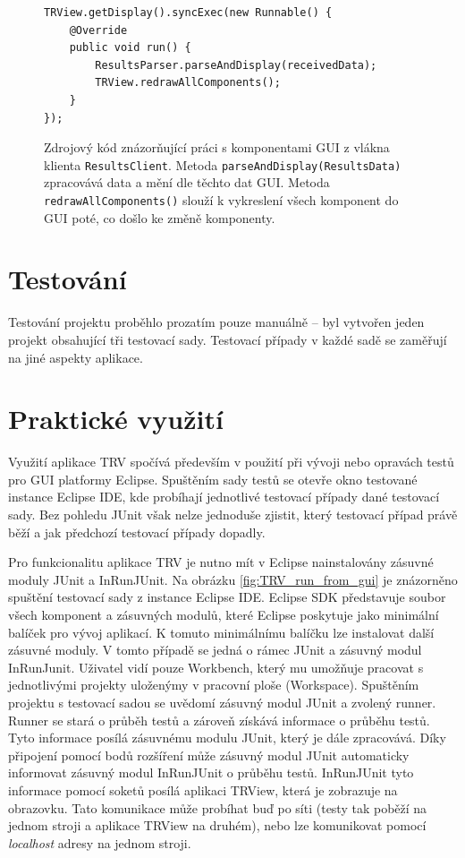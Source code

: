       	\lstset{language=java}
	\begin{figure}
	  \begin{lstlisting}[frame=single]
TRView.getDisplay().syncExec(new Runnable() {
	@Override
	public void run() {
		ResultsParser.parseAndDisplay(receivedData);
		TRView.redrawAllComponents();
	}
});
	  \end{lstlisting}
	  \caption{Zdrojový kód znázorňující práci s komponentami GUI z vlákna klienta \texttt{ResultsClient}. Metoda \texttt{parseAndDisplay(ResultsData)} zpracovává data a mění dle těchto dat GUI. Metoda \texttt{redrawAllComponents()} slouží k vykreslení všech komponent do GUI poté, co došlo ke změně komponenty.}
	  \label{code:syncExec}
	\end{figure}
      
      
      
  \section{Testování}
  Testování projektu proběhlo prozatím pouze manuálně -- byl vytvořen jeden projekt obsahující tři testovací sady. Testovací případy v každé sadě se zaměřují na jiné aspekty aplikace. 

  \section{Praktické využití}
  Využití aplikace TRV spočívá především v použití při vývoji nebo opravách testů pro GUI platformy Eclipse. Spuštěním sady testů se otevře okno testované instance Eclipse IDE, kde probíhají jednotlivé testovací případy dané testovací sady. Bez pohledu JUnit však nelze jednoduše zjistit, který testovací případ právě běží a jak předchozí testovací případy dopadly.
  
  Pro funkcionalitu aplikace TRV je nutno mít v Eclipse nainstalovány zásuvné moduly JUnit a InRunJUnit. Na obrázku \ref{fig:TRV_run_from_gui} je znázorněno spuštění testovací sady z instance Eclipse IDE. Eclipse SDK představuje soubor všech komponent a zásuvných modulů, které Eclipse poskytuje jako minimální balíček pro vývoj aplikací. K tomuto minimálnímu balíčku lze instalovat další zásuvné moduly. V tomto případě se jedná o rámec JUnit a zásuvný modul InRunJunit. Uživatel vidí pouze Workbench, který mu umožňuje pracovat s jednotlivými projekty uloženýmy v pracovní ploše (Workspace). Spuštěním projektu s testovací sadou se uvědomí zásuvný modul JUnit a zvolený runner. Runner se stará o průběh testů a zároveň získává informace o průběhu testů. Tyto informace posílá zásuvnému modulu JUnit, který je dále zpracovává. Díky připojení pomocí bodů rozšíření může zásuvný modul JUnit automaticky informovat zásuvný modul InRunJUnit o průběhu testů. InRunJUnit tyto informace pomocí soketů posílá aplikaci TRView, která je zobrazuje na obrazovku. Tato komunikace může probíhat buď po síti (testy tak poběží na jednom stroji a aplikace TRView na druhém), nebo lze komunikovat pomocí \emph{localhost} adresy na jednom stroji.
      
